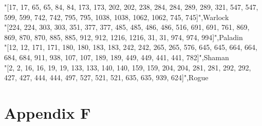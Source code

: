 \documentclass{report} %
\begin{document}
{"[17, 17, 65, 65, 84, 84, 173, 173, 202, 202, 238, 284, 284, 289, 289, 321, 547, 547, 599, 599, 742, 742, 795, 795, 1038, 1038, 1062, 1062, 745, 745]",Warlock\\
"[224, 224, 303, 303, 351, 377, 377, 485, 485, 486, 486, 516, 691, 691, 761, 869, 869, 870, 870, 885, 885, 912, 912, 1216, 1216, 31, 31, 974, 974, 994]",Paladin\\
"[12, 12, 171, 171, 180, 180, 183, 183, 242, 242, 265, 265, 576, 645, 645, 664, 664, 684, 684, 911, 938, 107, 107, 189, 189, 449, 449, 441, 441, 782]",Shaman\\
"[2, 2, 16, 16, 19, 19, 133, 133, 140, 140, 159, 159, 204, 204, 281, 281, 292, 292, 427, 427, 444, 444, 497, 527, 521, 521, 635, 635, 939, 624]",Rogue\\
}

\section*{Appendix F}

\end{document}
